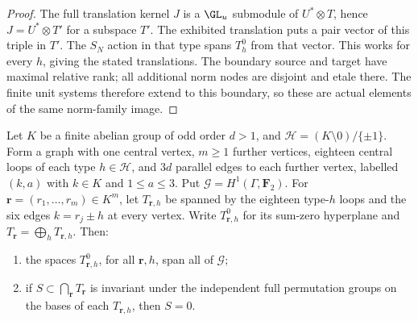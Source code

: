 \begin{proof}
The full translation kernel $J$ is a $\GL_u$ submodule of
$U^*\otimes T$, hence $J=U^*\otimes T'$ for a subspace $T'$.
The exhibited translation puts a pair vector of this triple
in $T'$. The $S_N$ action in that type spans $T_h^0$ from that
vector. This works for every $h$, giving the stated translations.
The boundary source and target have maximal relative rank;
all additional norm nodes are disjoint and etale there.
The finite unit systems therefore extend to this boundary, so
these are actual elements of the same norm-family image.
\end{proof}

\begin{lemma}
\label{lem:mixed-odd-common-graph-candidate}
Let $K$ be a finite abelian group of odd order $d>1$, and
$\mathcal H=(K\setminus0)/\{\pm1\}$. Form a graph with one
central vertex, $m\geq1$ further vertices, eighteen central
loops of each type $h\in\mathcal H$, and $3d$ parallel edges
to each further vertex, labelled $(k,a)$ with $k\in K$ and
$1\leq a\leq3$. Put $\mathcal G=H^1(\Gamma,\mathbf F_2)$.
For $\mathbf r=(r_1,\ldots,r_m)\in K^m$, let $T_{\mathbf r,h}$
be spanned by the eighteen type-$h$ loops and the six edges
$k=r_j\pm h$ at every vertex. Write $T_{\mathbf r,h}^0$ for
its sum-zero hyperplane and $T_{\mathbf r}=\bigoplus_hT_{\mathbf r,h}$.
Then:
\begin{enumerate}
\item the spaces $T_{\mathbf r,h}^0$, for all $\mathbf r,h$,
span all of $\mathcal G$;
\item if $S\subset\bigcap_{\mathbf r}T_{\mathbf r}$ is invariant
under the independent full permutation groups on the bases of
each $T_{\mathbf r,h}$, then $S=0$.
\end{enumerate}
\end{lemma}
